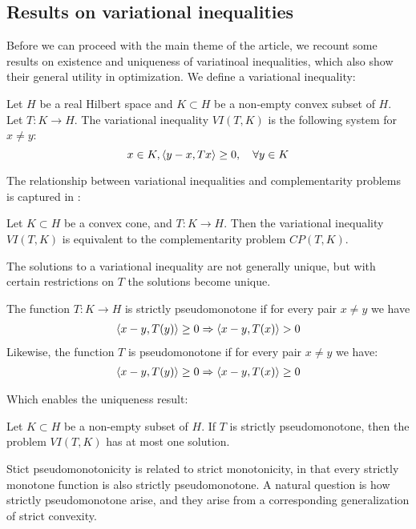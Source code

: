 \subsection{Results on variational inequalities}
Before we can proceed with the main theme of the article, we recount some results on existence and uniqueness of variatinoal inequalities, which also show their general utility in optimization.
We define a variational inequality:
\begin{definition}
  Let $H$ be a real Hilbert space and $K\subset H$ be a non-empty convex subset of $H$. Let $T: K \to H$. The variational inequality $VI(T,K)$ is the following system for $x\neq y$:
  \begin{equation}
    x \in K, \left \langle y-x,Tx \right \rangle \geq 0, \quad \forall y \in K
  \end{equation}
\end{definition}
The relationship between variational inequalities and complementarity problems is captured in \citep[Proposition 12.1]{hadjisavvas2006handbook}:
\begin{proposition}
  \label{prop:VI_CP_eq}
  Let $K\subset H$ be a convex cone, and $T: K \to H$. Then the variational inequality $VI(T,K)$ is equivalent to the complementarity problem $CP(T,K)$.
\end{proposition}
The solutions to a variational inequality are not generally unique, but with certain restrictions on $T$ the solutions become unique.
\begin{definition}
  \label{def:strict_pm}
 The function $T: K \to H$ is strictly pseudomonotone if for every pair $x\neq y$ we have
 \begin{align}
   \left \langle x-y,T(y) \right \rangle \geq 0 \Rightarrow \left \langle x-y,T(x) \right \rangle > 0
 \end{align}
 Likewise, the function $T$ is pseudomonotone if for every pair $x\neq y$ we have:
 \begin{align}
   \left \langle x-y,T(y) \right \rangle \geq 0 \Rightarrow \left \langle x-y,T(x) \right \rangle \geq 0
 \end{align}
\end{definition}
Which enables the uniqueness result:
\begin{theorem}
  \label{thm:uniqueness}
  Let $K\subset H$ be a non-empty subset of $H$. If $T$ is strictly pseudomonotone, then the problem $VI(T,K)$ has at most one solution.
\end{theorem}
Stict pseudomonotonicity is related to strict monotonicity, in that every strictly monotone function is also strictly pseudomonotone. A natural question is how strictly pseudomonotone arise, and they arise from a corresponding generalization of strict convexity.
